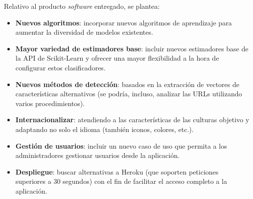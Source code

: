 Relativo al producto \textit{software} entregado, se plantea:

\begin{itemize}
	\item \textbf{Nuevos algoritmos}: incorporar nuevos algoritmos de aprendizaje para aumentar la diversidad de modelos existentes.
	\item  \textbf{Mayor variedad de estimadores base}: incluir nuevos estimadores base de la API de Scikit-Learn y ofrecer una mayor flexibilidad a la hora de configurar estos clasificadores.
	\item \textbf{Nuevos métodos de detección}: basados en la extracción de vectores de características alternativos (se podría, incluso, analizar las URLs utilizando varios procedimientos).
	\item \textbf{Internacionalizar}: atendiendo a las características de las culturas objetivo y adaptando no solo el idioma (también iconos, colores, etc.).
	\item \textbf{Gestión de usuarios}: incluir un nuevo caso de uso que permita a los administradores gestionar usuarios desde la aplicación.
	\item \textbf{Despliegue}: buscar alternativas a Heroku (que soporten peticiones superiores a 30 segundos) con el fin de facilitar el acceso completo a la aplicación.
\end{itemize}